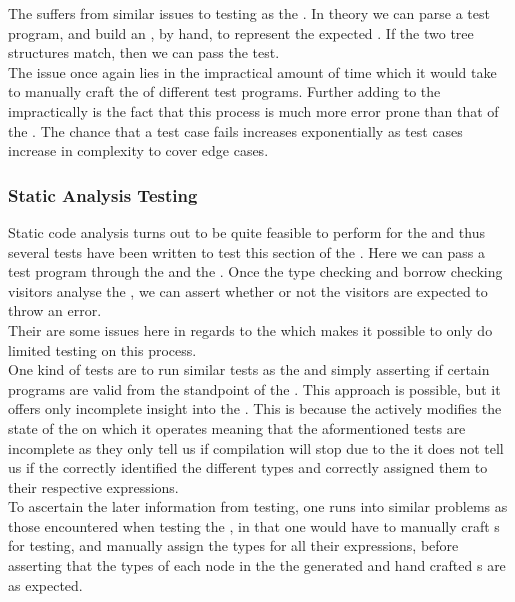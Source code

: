 The \parser{} suffers from similar issues to testing as the \lexer. In theory we can
parse a test program, and build an \ast{}, by hand, to represent the expected \ast.
If the two tree structures match, then we can pass the test. \\ 

The issue once again lies in the impractical amount of time which it would take to
manually craft the \ast{} of different test programs. Further adding to the
impractically is the fact that this process is much more error prone than that of the
\lexer. The chance that a test case fails increases exponentially as test cases
increase in complexity to cover edge cases.

\subsubsection{Static Analysis Testing}
\label{sec:testStatic}

Static code analysis turns out to be quite feasible to perform for the
\borrowChecker{} and thus several tests
have been written to test this section of the \static. Here we can pass a
test program through the \lexer{} and the \parser{}. Once the type checking and
borrow checking visitors analyse the \ast{}, we can assert whether or not the
visitors are expected to throw an error. \\
Their are some issues here in regards to the \typeChecker{} which makes it possible
to only do limited testing on this process. \\ 

One kind of tests are to run similar tests as the \borrowChecker{} and simply
asserting if certain programs are valid from the standpoint of the \typeChecker. This
approach is possible, but it offers only incomplete insight into the \typeChecker.
This is because the \typeChecker{} actively modifies the state of the \ast{} on which
it operates meaning that the aformentioned tests are incomplete as they only tell us
if compilation will stop due to the \typeChecker{} it does not tell us if the
\typeChecker{} correctly identified the different types and correctly assigned them
to their respective expressions. \\

To ascertain the later information from testing, one runs into similar problems as those
encountered when testing the \parser{}, in that one would have to manually craft
\ast s for testing, and manually assign the types for all their expressions, before
asserting that the types of each node in the the generated and hand crafted \ast s
are as expected.

